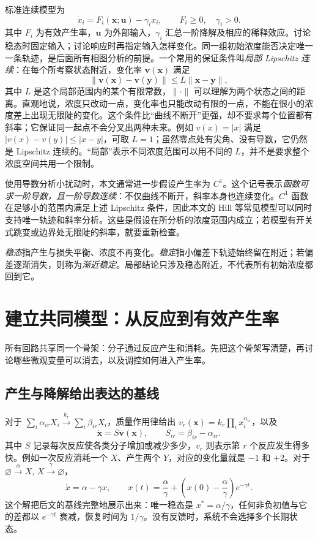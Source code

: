 \documentclass[11pt,a4paper,UTF8,fontset=fandol]{ctexart}
\begin{document}
标准连续模型为
\begin{equation}\dot x_i=F_i(\bm{x};\bm{u})-\gamma_i x_i,\qquad F_i\geq0,\quad\gamma_i>0.\end{equation}
其中 $F_i$ 为有效产生率，$\bm u$ 为外部输入，$\gamma_i$ 汇总一阶降解及相应的稀释效应。讨论稳态时固定输入；讨论响应时再指定输入怎样变化。同一组初始浓度能否决定唯一一条轨迹，是后面所有相图分析的前提。一个常用的保证条件叫\emph{局部 Lipschitz 连续}：在每个所考察状态附近，变化率 $\bm v(\bm x)$ 满足
\[
\|\bm v(\bm x)-\bm v(\bm y)\|\leq L\|\bm x-\bm y\|,
\]
其中 $L$ 是这个局部范围内的某个有限常数，$\|\cdot\|$ 可以理解为两个状态之间的距离。直观地说，浓度只改动一点，变化率也只能改动有限的一点，不能在很小的浓度差上出现无限陡的变化。这个条件比“曲线不断开”更强，却不要求每个位置都有斜率；它保证同一起点不会分叉出两种未来。例如 $v(x)=|x|$ 满足 $|v(x)-v(y)|\leq|x-y|$，可取 $L=1$；虽然零点处有尖角、没有导数，它仍然是 Lipschitz 连续的。“局部”表示不同浓度范围可以用不同的 $L$，并不是要求整个浓度空间共用一个限制。

使用导数分析小扰动时，本文通常进一步假设产生率为 $C^1$。这个记号表示\emph{函数可求一阶导数，且一阶导数连续}：不仅曲线不断开，斜率本身也连续变化。$C^1$ 函数在足够小的范围内满足上述 Lipschitz 条件，因此本文的 Hill 等常见模型可以同时支持唯一轨迹和斜率分析。这些是假设在所分析的浓度范围内成立；若模型有开关式跳变或边界处无限陡的斜率，就要重新检查。

\emph{稳态}指产生与损失平衡、浓度不再变化。\emph{稳定}指小偏差下轨迹始终留在附近；若偏差逐渐消失，则称为\emph{渐近稳定}。局部结论只涉及稳态附近，不代表所有初始浓度都回到它。



\section{建立共同模型：从反应到有效产生率}
所有回路共享同一个骨架：分子通过反应产生和消耗。先把这个骨架写清楚，再讨论哪些微观变量可以消去，以及调控如何进入产生率。
\subsection{产生与降解给出表达的基线}
对于 $\sum_i\alpha_{ir}X_i\xrightarrow{k_r}\sum_i\beta_{ir}X_i$，质量作用律给出 $v_r(\bm x)=k_r\prod_i x_i^{\alpha_{ir}}$，以及
\begin{equation}\dot{\bm x}=S\bm v(\bm x),\qquad S_{ir}=\beta_{ir}-\alpha_{ir}.\end{equation}
其中 $S$ 记录每次反应使各类分子增加或减少多少，$v_r$ 则表示第 $r$ 个反应发生得多快。例如一次反应消耗一个 $X$、产生两个 $Y$，对应的变化量就是 $-1$ 和 $+2$。对于 $\varnothing\xrightarrow{\alpha}X$, $X\xrightarrow{\gamma}\varnothing$，
\begin{equation}\dot x=\alpha-\gamma x,\qquad x(t)=\frac\alpha\gamma+\left(x(0)-\frac\alpha\gamma\right)e^{-\gamma t}.\end{equation}
这个解把后文的基线完整地展示出来：唯一稳态是 $x^*=\alpha/\gamma$，任何非负初值与它的差都以 $e^{-\gamma t}$ 衰减，恢复时间为 $1/\gamma$。没有反馈时，系统不会选择多个长期状态。
\end{document}
